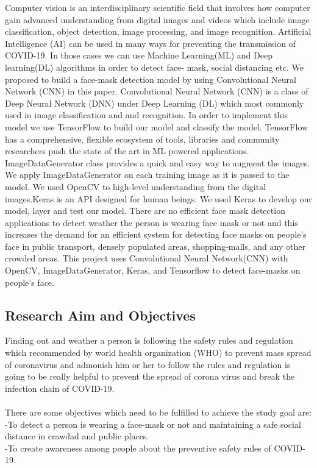 \documentclass[conference]{IEEEtran}
\begin{document}
Computer vision is an interdisciplinary scientific field that involves how computer gain advanced understanding from digital images and videos which include image classification, object detection, image processing, and image recognition. Artificial Intelligence (AI) can be used in many ways for preventing the transmission of COVID-19. In those cases we can use Machine Learning(ML) and Deep learning(DL) algorithms in order to detect face- mask, social distancing etc\cite{agarwal2020unleashing}. We proposed to build a face-mask detection model by using  Convolutional Neural Network (CNN) in this paper. Convolutional Neural Network (CNN)  is a class of Deep Neural Network (DNN) under Deep Learning (DL) which most commonly used in image classification and and recognition. In order to implement this model we use TensorFlow  to build our model and classify the model. TensorFlow has a comprehensive, flexible ecosystem of tools, libraries and community researchers push the state of the art in ML powered applications.
ImageDataGenerator class provides a quick and easy way to augment the images.  We apply ImageDataGenerator on each training image as it is passed to the model. We used OpenCV to high-level understanding from the digital images.Keras is an API designed for human beings. We used Keras to develop our model, layer and test our model. There are no efficient face mask detection applications to 
detect weather the person is wearing face mask or not and this 
increases the demand for an efficient system for detecting 
face masks on people's face in public transport, densely 
populated areas, shopping-malls, and any other crowded areas. This 
project uses Convolutional Neural Network(CNN) with OpenCV, ImageDataGenerator, Keras, and Tensorflow to detect face-masks on people's face.\\
\subsection{Research Aim and Objectives}
Finding out and weather a person is following the safety rules and regulation which recommended by world health organization (WHO) to prevent mass spread of coronavirus and admonish him or her to follow the rules and regulation is going to be really helpful to prevent the spread of corona virus and break the infection chain of COVID-19.\\\\
There  are  some  objectives  which  need  to  be  fulfilled  to achieve the study goal are:\\
-To detect a person is wearing a face-mask or not and maintaining a safe social distance in crawdad and public places.\\
-To create awareness among people about the preventive safety rules of COVID-19.\\
\end{document}
